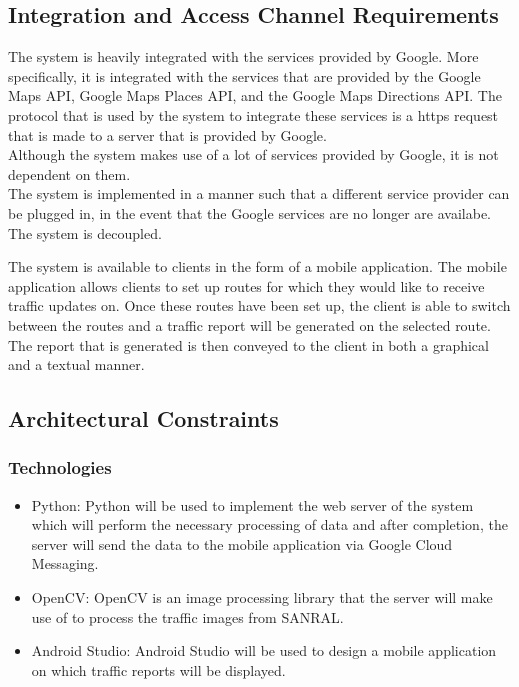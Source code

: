 \documentclass[a4paper,12pt]{article}
\begin{document}
\subsection{Integration and Access Channel Requirements}
The system is heavily integrated with the services provided by Google. More specifically, it is integrated with the services that are provided by the Google Maps API, Google Maps Places API, and the Google Maps Directions API. The protocol that is used by the system to integrate these services is a https request that is made to a server that is provided by Google. \\
Although the system makes use of a lot of services provided by Google, it is not dependent on them.\\
The system is implemented in a manner such that a different service provider can be plugged in, in the event that the Google services are no longer are availabe. The system is decoupled.

The system is available to clients in the form of a mobile application. The mobile application allows clients to set up routes for which they would like to receive traffic updates on. Once these routes have been set up, the client is able to switch between the routes and a traffic report will be generated on the selected route. The report that is generated is then conveyed to the client in both a graphical and a textual manner.

\subsection{Architectural Constraints}
\subsubsection{Technologies}
\begin{itemize}
\item Python: Python will be used to implement the web server of the system which will perform the necessary processing of data and after completion, the server will send the data to the mobile application via Google Cloud Messaging.
\item OpenCV: OpenCV is an image processing library that the server will make use of to process the traffic images from SANRAL.
\item Android Studio: Android Studio will be used to design a mobile application on which traffic reports will be displayed.
\end{itemize}
\end{document}
